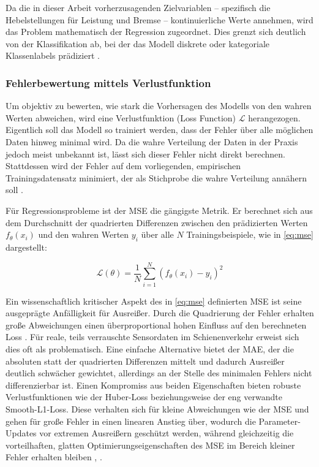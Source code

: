 Da die in dieser Arbeit vorherzusagenden Zielvariablen -- spezifisch die Hebelstellungen für Leistung und Bremse -- kontinuierliche Werte annehmen, wird das Problem mathematisch der Regression zugeordnet. 
Dies grenzt sich deutlich von der Klassifikation ab, bei der das Modell diskrete oder kategoriale Klassenlabels prädiziert \cite[vgl.~S.~3]{chap2_Bis06}.

\subsubsection{Fehlerbewertung mittels Verlustfunktion}

Um objektiv zu bewerten, wie stark die Vorhersagen des Modells von den wahren Werten abweichen, wird eine Verlustfunktion (Loss Function) $\mathcal{L}$ herangezogen. 
Eigentlich soll das Modell so trainiert werden, dass der Fehler über alle möglichen Daten hinweg minimal wird. 
Da die wahre Verteilung der Daten in der Praxis jedoch meist unbekannt ist, lässt sich dieser Fehler nicht direkt berechnen. 
Stattdessen wird der Fehler auf dem vorliegenden, empirischen Trainingsdatensatz minimiert, der als Stichprobe die wahre Verteilung annähern soll \cite[vgl.~S.~274f.]{chap2_Goo16}.

Für Regressionsprobleme ist der \gls{MSE} die gängigste Metrik. 
Er berechnet sich aus dem Durchschnitt der quadrierten Differenzen zwischen den prädizierten Werten $f_\theta(x_i)$ und den wahren Werten $y_i$ über alle $N$ Trainingsbeispiele, wie in \autoref{eq:mse} dargestellt:

\begin{equation} \label{eq:mse}
\mathcal{L}(\theta) = \frac{1}{N} \sum_{i=1}^N \left( f_\theta(x_i) - y_i \right)^2
\end{equation}

Ein wissenschaftlich kritischer Aspekt des in \autoref{eq:mse} definierten \gls{MSE} ist seine ausgeprägte Anfälligkeit für Ausreißer.
Durch die Quadrierung der Fehler erhalten große Abweichungen einen überproportional hohen Einfluss auf den berechneten Loss \cite[vgl.~S.~8]{chap2_Ter25}. 
Für reale, teils verrauschte Sensordaten im Schienenverkehr erweist sich dies oft als problematisch. 
Eine einfache Alternative bietet der \gls{MAE}, der die absoluten statt der quadrierten Differenzen mittelt und dadurch Ausreißer deutlich schwächer gewichtet, allerdings an der Stelle des minimalen Fehlers nicht differenzierbar ist. 
Einen Kompromiss aus beiden Eigenschaften bieten robuste Verlustfunktionen wie der Huber-Loss beziehungsweise der eng verwandte Smooth-L1-Loss. 
Diese verhalten sich für kleine Abweichungen wie der \gls{MSE} und gehen für große Fehler in einen linearen Anstieg über, wodurch die Parameter-Updates vor extremen Ausreißern geschützt werden, während gleichzeitig die vorteilhaften, glatten Optimierungseigenschaften des \gls{MSE} im Bereich kleiner Fehler erhalten bleiben \cite[vgl.~S.~11f.]{chap2_Ter25}, \cite[vgl.~S.~349f.]{chap2_Has09}.

